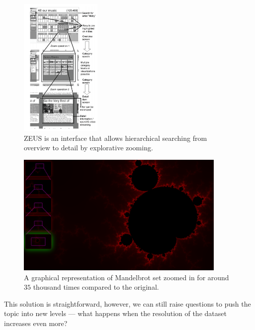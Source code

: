\begin{figure}[H]
\centering
\includegraphics[width=0.35\textwidth,keepaspectratio]{Figures/Chapter1/zeus.png}
\decoRule
\caption[Multiple Levels of Overview Plus Detail]{ZEUS is an interface that allows hierarchical searching from overview to detail by explorative zooming\cite{gundelsweiler2007zeus}.}
\label{fig:zeus}
\end{figure}

\begin{figure}[H]
\centering
\includegraphics[width=0.9\textwidth,keepaspectratio]{Figures/Chapter1/multiplelevels.png}
\decoRule
\caption[Zoomed-in Fractal Image]{A graphical representation of Mandelbrot set zoomed in for around $35$ thousand times compared to the original.}
\label{fig:multiplelevels}
\end{figure}

This solution is straightforward, however, we can still raise questions to push the topic into new levels --- what happens when the resolution of the dataset increases even more?

